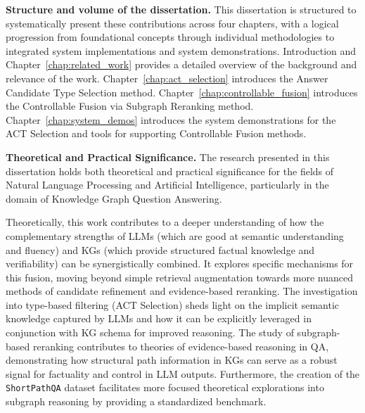 \textbf{Structure and volume of the dissertation.}
This dissertation is structured to systematically present these contributions across four chapters, with a logical progression from foundational concepts through individual methodologies to integrated system implementations and system demonstrations. Introduction and Chapter~\ref{chap:related_work} provides a detailed overview of the background and relevance of the work. Chapter~\ref{chap:act_selection} introduces the Answer Candidate Type Selection method. Chapter~\ref{chap:controllable_fusion} introduces the Controllable Fusion via Subgraph Reranking method. Chapter~\ref{chap:system_demos} introduces the system demonstrations for the ACT Selection and tools for supporting Controllable Fusion methods.

\textbf{Theoretical and Practical Significance.}
The research presented in this dissertation holds both theoretical and practical significance for the fields of Natural Language Processing and Artificial Intelligence, particularly in the domain of Knowledge Graph Question Answering.

Theoretically, this work contributes to a deeper understanding of how the complementary strengths of LLMs (which are good at semantic understanding and fluency) and KGs (which provide structured factual knowledge and verifiability) can be synergistically combined. It explores specific mechanisms for this fusion, moving beyond simple retrieval augmentation towards more nuanced methods of candidate refinement and evidence-based reranking. The investigation into type-based filtering (ACT Selection) sheds light on the implicit semantic knowledge captured by LLMs and how it can be explicitly leveraged in conjunction with KG schema for improved reasoning. The study of subgraph-based reranking contributes to theories of evidence-based reasoning in QA, demonstrating how structural path information in KGs can serve as a robust signal for factuality and control in LLM outputs. Furthermore, the creation of the \texttt{ShortPathQA} dataset facilitates more focused theoretical explorations into subgraph reasoning by providing a standardized benchmark.

